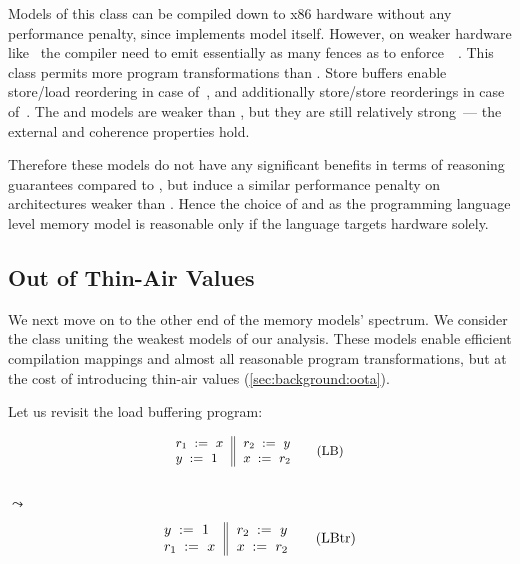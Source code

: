 Models of this class can be compiled down to x86 hardware without any 
performance penalty, since \Intel implements \TSO model itself.
However, on weaker hardware like~\POWER 
the compiler need to emit essentially as many fences 
as to enforce~\SC~\cite{Lustig-al:AISCA15}. 
This class permits more program transformations than \SC.
Store buffers enable store/load reordering in case of~\TSO,
and additionally store/store reorderings in case of~\PSO.
The \TSO and \PSO models are weaker than \SC, 
but they are still relatively strong~---
the external \DRF and coherence properties hold.

Therefore these models do not have any significant 
benefits in terms of reasoning guarantees compared to \SC,
but induce a similar performance penalty 
on architectures weaker than \Intel. 
Hence the choice of \TSO and \PSO as the programming language level
memory model is reasonable only if the language targets \Intel hardware solely. 

\subsection{Out of Thin-Air Values}
\label{sec:analysis:oota}

We next move on to the other end of the memory models' spectrum. 
We consider the class uniting the weakest models of our analysis.
These models enable efficient compilation mappings and 
almost all reasonable program transformations, but at the cost of 
introducing thin-air values (\cref{sec:background:oota}).

Let us revisit the load buffering program:  

\begin{minipage}{0.43\linewidth}
\begin{equation*}
\small
\inarrII{
  \readInst{}{r_1}{x}     \\
  \writeInst{}{y}{1}      \\
}{
  \readInst{}{r_2}{y}     \\
  \writeInst{}{x}{r_2}    \\
}
\tag{LB}\label{ex:lbA}
\end{equation*}
\end{minipage}\hfill%
\begin{minipage}{0.09\linewidth}
\Large~\\ $\leadsto$
\end{minipage}\hfill%
\begin{minipage}{0.43\linewidth}
\begin{equation*}
\inarrII{
  \writeInst{}{y}{1}      \\
  \readInst{}{r_1}{x}     \\
}{
  \readInst{}{r_2}{y}     \\
  \writeInst{}{x}{r_2}    \\
}
\tag{LBtr}\label{ex:lbB}
\end{equation*}
\end{minipage}

